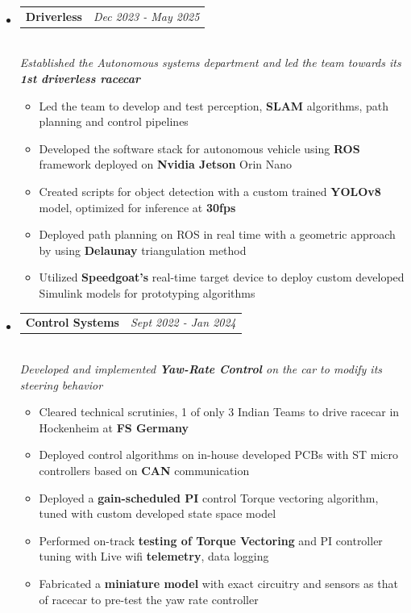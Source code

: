 \documentclass[a4paper,11pt]{article}
\makeatletter
\newcommand{\resumeProject}[3]{
\vspace{2.5mm}\item
    \begin{tabular*}{0.98\textwidth}[t]{l@{\extracolsep{\fill}}r}
        \textbf{#1} & \textit{\footnotesize{#3}} \\
    \end{tabular*}\\[-1mm]
    \footnotesize{\textit{#2}}
}
\newcommand{\resumeSubHeadingListStart}{\begin{itemize}[leftmargin=*,labelsep=0mm]}
\newcommand{\resumeItemListStart}{\begin{justify}\begin{itemize}[leftmargin=3ex, rightmargin=2ex, noitemsep,labelsep=1.2mm,itemsep=0mm]\small}
\newcommand{\resumeSubHeadingListEnd}{\end{itemize}\vspace{2mm}}
\newcommand{\resumeItemListEnd}{\end{itemize}\end{justify}\vspace{-2mm}}
\makeatother
\begin{document}
\vspace{-1.5mm}
\resumeSubHeadingListStart
    \resumeProject
      {Driverless}
      {Established the Autonomous systems department and led the team towards its \textbf{1st driverless racecar}}
      {Dec 2023 - May 2025}
      \resumeItemListStart
        \item {Led the team to develop and test perception, \textbf{SLAM} algorithms, path planning and control pipelines}
        \item {Developed the software stack for autonomous vehicle using \textbf{ROS} framework deployed on \textbf{Nvidia Jetson} Orin Nano}
        \item {Created scripts for object detection with a custom trained \textbf{YOLOv8} model, optimized for inference at \textbf{30fps}}
        \item {Deployed path planning on ROS in real time with a geometric approach by using \textbf{Delaunay} triangulation method}
        \item {Utilized \textbf{Speedgoat's} real-time target device to deploy custom developed Simulink models for prototyping algorithms}
      \resumeItemListEnd
      \vspace{-1.5mm}
    \resumeProject
      {Control Systems}
      {Developed and implemented \textbf{Yaw-Rate Control} on the car to modify its steering behavior}
      {Sept 2022 - Jan 2024}
      \resumeItemListStart
        \item {Cleared technical scrutinies, 1 of only 3 Indian Teams to drive racecar in Hockenheim at \textbf{FS Germany}}
        \item {Deployed control algorithms on in-house developed PCBs with ST micro controllers based on \textbf{CAN} communication}
        \item {Deployed a \textbf{gain-scheduled PI} control Torque vectoring algorithm, tuned with custom developed state space model}
        \item {Performed on-track \textbf{testing of Torque Vectoring} and PI controller tuning with Live wifi \textbf{telemetry}, data logging}
        \item {Fabricated a \textbf{miniature model} with exact circuitry and sensors as that of racecar to pre-test the yaw rate controller}
      \resumeItemListEnd
\resumeSubHeadingListEnd
\vspace{-4mm}
\end{document}
